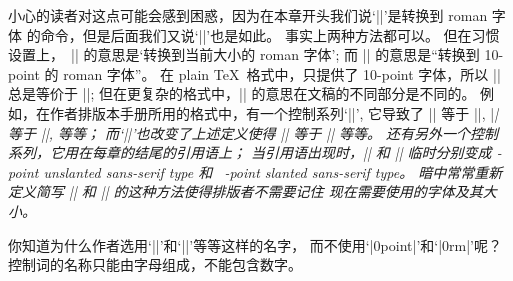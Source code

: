 小心的读者对这点可能会感到困惑，因为在本章开头我们说`|\rm|'是转换到 roman 字体%
的命令，但是后面我们又说`|\tenrm|'也是如此。%
事实上两种方法都可以。%
但在习惯设置上，~|\rm| 的意思是`转换到当前大小的 roman 字体';
而 |\tenrm| 的意思是``转换到 10-point 的 roman 字体''。%
在 plain \TeX\ 格式中，只提供了 10-point 字体，所以 |\rm| 总是等价于 |\tenrm|;
但在更复杂的格式中，|\rm| 的意思在文稿的不同部分是不同的。%
例如，在作者排版本手册所用的格式中，有一个控制系列`|\tenpoint|',
它导致了 |\rm| 等于 |\tenrm|, |\sl| 等于 |\tensl|, 等等；
而`|\ninepoint|'也改变了上述定义使得 |\rm| 等于 |\ninerm| 等等。%
还有另外一个控制系列，它用在每章的结尾的引用语上；
当引用语出现时，|\rm| 和 |\sl| 临时分别变成 {-point
unslanted sans-serif type} 和%
~{-point slanted sans-serif type}。%
暗中常常重新定义简写 |\rm| 和 |\sl| 的这种方法使得排版者不需要记住%
现在需要使用的字体及其大小。

\exercise \1你知道为什么作者选用`|\tenpoint|'和`|\tenrm|'等等这样的名字，
而不使用`|\10point|'和`|\10rm|'\allowbreak\hbox{呢？}
\answer 控制词的名称只能由字母组成，不能包含数字。

